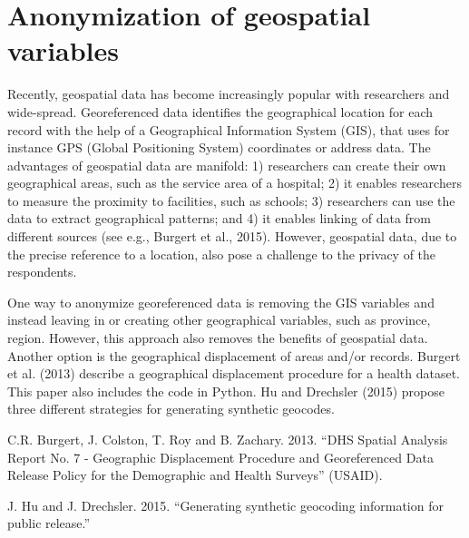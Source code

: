 \documentclass[letterpaper,10pt,english]{sphinxmanual}
\begin{document}
\section{Anonymization of geospatial variables}
\label{\detokenize{anon_methods:anonymization-of-geospatial-variables}}
Recently, geospatial data has become increasingly popular with
researchers and wide-spread. Georeferenced data identifies the
geographical location for each record with the help of a Geographical
Information System (GIS), that uses for instance GPS (Global Positioning
System) coordinates or address data. The advantages of geospatial data
are manifold: 1) researchers can create their own geographical areas,
such as the service area of a hospital; 2) it enables researchers to
measure the proximity to facilities, such as schools; 3) researchers can
use the data to extract geographical patterns; and 4) it enables linking
of data from different sources (see e.g., Burgert et al., 2015).
However, geospatial data, due to the precise reference to a location,
also pose a challenge to the privacy of the respondents.

One way to anonymize georeferenced data is removing the GIS variables
and instead leaving in or creating other geographical variables, such as
province, region. However, this approach also removes the benefits of
geospatial data. Another option is the geographical displacement of
areas and/or records. Burgert et al. (2013) describe a geographical
displacement procedure for a health dataset. This paper also includes
the code in Python. Hu and Drechsler (2015) propose three different
strategies for generating synthetic geocodes.


C.R. Burgert, J. Colston, T. Roy and B. Zachary. 2013. “DHS Spatial
Analysis Report No. 7 - Geographic Displacement Procedure and
Georeferenced Data Release Policy for the Demographic and Health
Surveys” (USAID). 

J. Hu and J. Drechsler. 2015. “Generating synthetic geocoding
information for public release.”
\end{document}
